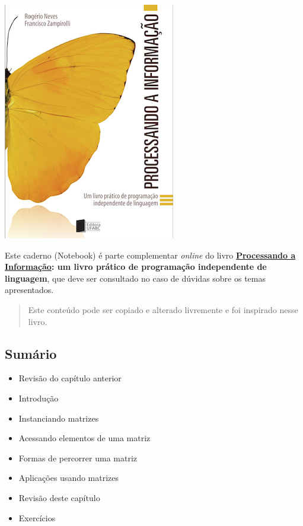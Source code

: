 \documentclass[12pt,a4paper]{article}
\providecommand{\tightlist}{%
      \setlength{\itemsep}{0pt}\setlength{\parskip}{0pt}}
\begin{document}
    \includegraphics{"figs/Capa_Processando_Informacao.jpg"}

Este caderno (Notebook) é parte complementar \emph{online} do livro
\textbf{\href{https://editora.ufabc.edu.br/matematica-e-ciencias-da-computacao/58-processando-a-informacao}{Processando
a Informação}: um livro prático de programação independente de
linguagem}, que deve ser consultado no caso de dúvidas sobre os temas
apresentados.

\begin{quote}
Este conteúdo pode ser copiado e alterado livremente e foi inspirado
nesse livro.
\end{quote}

    \hypertarget{sumuxe1rio}{%
\subsection{Sumário}\label{sumuxe1rio}}

\begin{itemize}
\tightlist
\item
  Revisão do capítulo anterior
\item
  Introdução
\item
  Instanciando matrizes
\item
  Acessando elementos de uma matriz
\item
  Formas de percorrer uma matriz
\item
  Aplicações usando matrizes
\item
  Revisão deste capítulo
\item
  Exercícios
\end{itemize}
\end{document}
